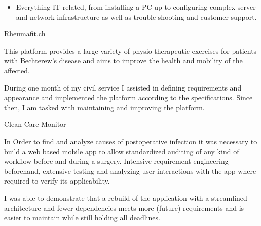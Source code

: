 \documentclass[9pt,a4paper]{altacv}
\begin{document}
\divider

\begin{itemize}
\item Everything IT related, from installing a PC up to configuring complex server and network infrastructure
as well as trouble shooting and customer support.
\end{itemize}



%
\makebox[0pt][l]{%
  \hspace{-5cm}
  \raisebox{-\totalheight}[0pt][0pt]{%
   {\color{background}\fontsize{250}{48}\faHeart}
}}%
{\color{emphasis}Rheumafit.ch\par}
\smallskip
{\small{}}%
{\small{}}\par
\smallskip

This platform provides a large variety of physio therapeutic exercises for patients with Bechterew's disease
and aims to improve the health and mobility of the affected.

\smallskip

During one month of my civil service I assisted in defining requirements and appearance and
implemented the platform according to the specifications. Since then, I am tasked with maintaining
and improving the platform.


\divider


{\color{emphasis}Clean Care Monitor\par}
\smallskip
{\small{}}%
{\small{}}\par
\smallskip

In Order to find and analyze causes of postoperative infection it was necessary to
build a web based mobile app to allow standardized auditing of any kind of workflow
before and during a surgery. Intensive requirement engineering beforehand,
extensive testing and analyzing user interactions with the app where required
to verify its applicability.

\smallskip

I was able to demonstrate that a rebuild of the application with a streamlined architecture
and fewer dependencies meets more (future) requirements and is easier to maintain while still holding all deadlines.
\end{document}
